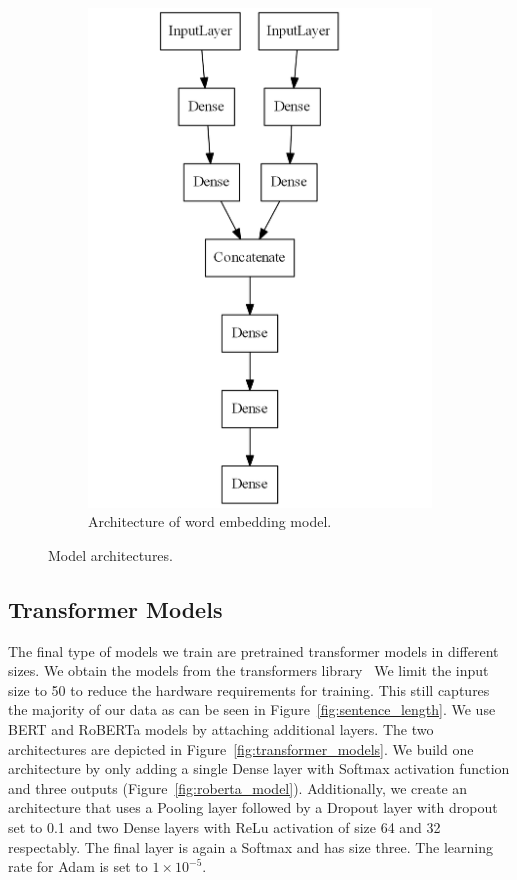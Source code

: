 \documentclass[acmsmall,nonacm]{acmart}
\begin{document}
\begin{figure}[h!]
\begin{subfigure}[c]{0.35\textwidth}
    \includegraphics[width=\textwidth]{assets/embedded_model.png}
    \caption{Architecture of word embedding model.}
  \label{fig:embedding_model}
  \end{subfigure}
  \caption{Model architectures.}
  \label{fig:model_architectures}
\end{figure}




\subsection{Transformer Models} \label{sec:method_transformer}
The final type of models we train are pretrained transformer models in different sizes. We obtain the models from the transformers library~\cite{transformers-wolf-etal-2020} We limit the input size to 50 to reduce the hardware requirements for training. This still captures the majority of our data as can be seen in Figure~\ref{fig:sentence_length}. We use BERT and RoBERTa models by attaching additional layers. The two architectures are depicted in Figure~\ref{fig:transformer_models}. We build one architecture by only adding a single Dense layer with Softmax activation function and three outputs (Figure~\ref{fig:roberta_model}). Additionally, we create an architecture that uses a Pooling layer followed by a Dropout layer with dropout set to 0.1 and two Dense layers with ReLu activation of size 64 and 32 respectably. The final layer is again a Softmax and has size three.  The learning rate for Adam is set to $1\times10^{-5}$.
\end{document}
